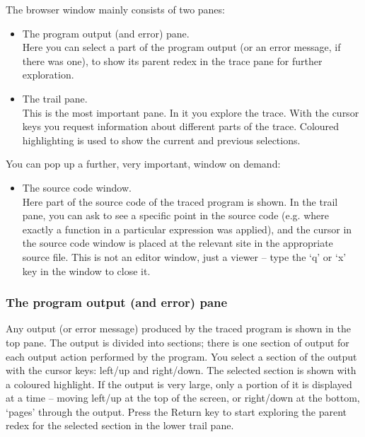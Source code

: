\documentclass[12pt]{article}
\begin{document}
The browser window mainly consists of two panes:

\begin{itemize}

\item The program output (and error) pane. \\
Here you can select a part of the program output (or an error message,
if there was one), to show its parent redex in the trace pane for
further exploration.

\item The trail pane. \\
This is the most important pane. In it you explore the trace.
With the cursor keys you request information about different parts
of the trace.  Coloured highlighting is used to show the current and
previous selections.

\end{itemize}

You can pop up a further, very important, window on demand:
\begin{itemize}
\item The source code window. \\
Here part of the source code of the traced program is shown. In the trail
pane, you can ask to see a specific point in the source code (e.g.
where exactly a function in a particular expression was applied), and
the cursor in the source code window is placed at the relevant site
in the appropriate source file.  This is not an editor window, just
a viewer -- type the `q' or `x' key in the window to close it.

\end{itemize}


\subsubsection{The program output (and error) pane}

Any output (or error message) produced by the traced program is shown
in the top pane.  The output is divided into sections; there is one
section of output for each output action performed by the program. You
select a section of the output with the cursor keys: left/up and
right/down.  The selected section is shown with a coloured highlight.
If the output is very large, only a portion of it is displayed at a
time -- moving left/up at the top of the screen, or right/down at the
bottom, `pages' through the output.  Press the Return key to start
exploring the parent redex for the selected section in the lower
trail pane.
\end{document}
